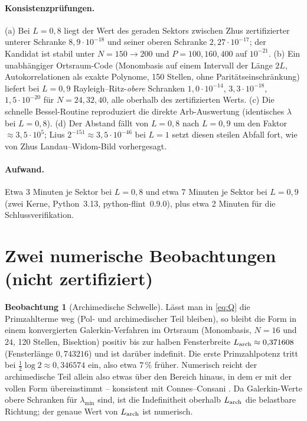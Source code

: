 \documentclass[11pt,a4paper]{article}
\theoremstyle{definition}
\newtheorem{observation}{Beobachtung}
\begin{document}
\paragraph{Konsistenzprüfungen.}
(a) Bei $L=0{,}8$ liegt der Wert des geraden Sektors zwischen Zhus zertifizierter unterer Schranke $8{,}9\cdot10^{-18}$ und seiner oberen Schranke $2{,}27\cdot10^{-17}$; der Kandidat ist stabil unter $N=150\to200$ und $P=100,160,400$ auf $10^{-21}$.
(b) Ein unabhängiger Ortsraum-Code (Monombasis auf einem Intervall der Länge $2L$, Autokorrelationen als exakte Polynome, 150 Stellen, ohne Paritätseinschränkung) liefert bei $L=0{,}9$ Rayleigh--Ritz-\emph{obere} Schranken $1{,}0\cdot10^{-14}$, $3{,}3\cdot10^{-18}$, $1{,}5\cdot10^{-20}$ für $N=24,32,40$, alle oberhalb des zertifizierten Werts.
(c) Die schnelle Bessel-Routine reproduziert die direkte Arb-Auswertung (identisches $\lambda$ bei $L=0{,}8$).
(d) Der Abstand fällt von $L=0{,}8$ nach $L=0{,}9$ um den Faktor $\approx3{,}5\cdot10^{5}$; Lius $2^{-151}\approx3{,}5\cdot10^{-46}$ bei $L=1$ setzt diesen steilen Abfall fort, wie von Zhus Landau--Widom-Bild vorhergesagt.

\paragraph{Aufwand.} Etwa 3 Minuten je Sektor bei $L=0{,}8$ und etwa 7 Minuten je Sektor bei $L=0{,}9$ (zwei Kerne, Python~3.13, python-flint~0.9.0), plus etwa 2 Minuten für die Schlussverifikation.

\section{Zwei numerische Beobachtungen (nicht zertifiziert)}

\begin{observation}[Archimedische Schwelle]
Lässt man in \eqref{eq:Q} die Primzahlterme weg (Pol- und archimedischer Teil bleiben), so bleibt die Form in einem konvergierten Galerkin-Verfahren im Ortsraum (Monombasis, $N=16$ und $24$, 120 Stellen, Bisektion) positiv bis zur halben Fensterbreite $L_{\rm arch}\approx0{,}371608$ (Fensterlänge $0{,}743216$) und ist darüber indefinit. Die erste Primzahlpotenz tritt bei $\frac12\log2\approx0{,}346574$ ein, also etwa $7\,\%$ früher. Numerisch reicht der archimedische Teil allein also etwas über den Bereich hinaus, in dem er mit der vollen Form übereinstimmt -- konsistent mit Connes--Consani \cite{CC21}. Da Galerkin-Werte obere Schranken für $\lambda_{\min}$ sind, ist die Indefinitheit oberhalb $L_{\rm arch}$ die belastbare Richtung; der genaue Wert von $L_{\rm arch}$ ist numerisch.
\end{observation}
\end{document}

